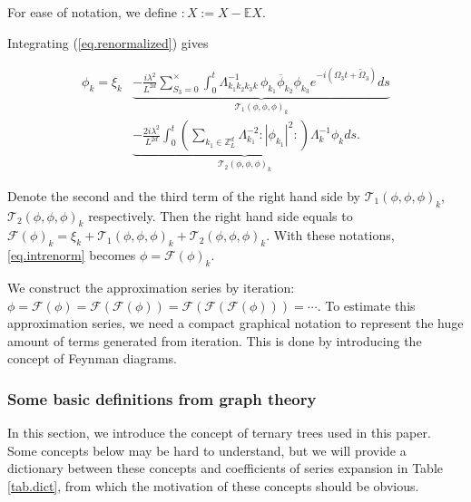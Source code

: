 For ease of notation, we define $:X:=X-\mathbb{E}X$.

Integrating (\ref{eq.renormalized}) gives

\begin{equation}\label{eq.intrenorm}
\begin{split}
 \phi_k =\xi_k
 &\underbrace{- \frac{i\lambda^2}{L^{2d}} \sum\limits^{\times}_{S_3=0} \int^{t}_0 \Lambda_{k_1k_2k_3k}^{-1}\,\phi_{k_1}\overline{\phi}_{k_2} \phi_{k_3}e^{- i (\Omega_3t+\widetilde{\Omega}_3)} ds}_{\mathcal{T}_1(\phi,\phi,\phi)_k}
 \\
 &\underbrace{- \frac{2i\lambda^2}{L^{2d}} \int^{t}_0 \left(\sum\limits_{k_1\in \mathbb{Z}^d_L} \Lambda_{k_1}^{-2}:|\phi_{k_1}|^2: \right) \Lambda_{k}^{-1}\phi_{k} ds}_{\mathcal{T}_2(\phi,\phi,\phi)_k}.
\end{split}
\end{equation}


Denote the second and the third term of the right hand side by $\mathcal{T}_1(\phi,\phi,\phi)_k$, $\mathcal{T}_2(\phi,\phi,\phi)_k$ respectively. Then the right hand side equals to $\mathcal{F}(\phi)_k=\xi_k+\mathcal{T}_1(\phi,\phi,\phi)_k+\mathcal{T}_2(\phi,\phi,\phi)_k$. With these notations, \eqref{eq.intrenorm} becomes $\phi=\mathcal{F}(\phi)_k$. 

We construct the approximation series by iteration: $\phi=\mathcal{F}(\phi)=\mathcal{F}(\mathcal{F}(\phi))=\mathcal{F}(\mathcal{F}(\mathcal{F}(\phi)))=\cdots$. To estimate this approximation series, we need a compact graphical notation to represent the huge amount of terms generated from iteration. This is done by introducing the concept of Feynman diagrams.

\subsubsection{Some basic definitions from graph theory} In this section, we introduce the concept of ternary trees used in this paper. Some concepts below may be hard to understand, but we will 
provide a dictionary between these concepts and coefficients of series expansion in Table \ref{tab.dict}, from which the motivation of these concepts should be obvious.


